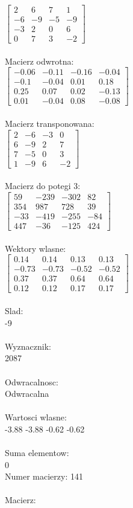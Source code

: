 \documentclass[a4paper,12pt]{article}
\begin{document}
$\begin{bmatrix} 2&6&7&1\\-6&-9&-5&-9\\-3&2&0&6\\0&7&3&-2 \end{bmatrix}$
\\
\\
Macierz odwrotna:\\

$\begin{bmatrix} -0.06&-0.11&-0.16&-0.04\\-0.1&-0.04&0.01&0.18\\0.25&0.07&0.02&-0.13\\0.01&-0.04&0.08&-0.08 \end{bmatrix}$
\\
\\
Macierz transponowana:\\

$\begin{bmatrix} 2&-6&-3&0\\6&-9&2&7\\7&-5&0&3\\1&-9&6&-2 \end{bmatrix}$
\\
\\
Macierz do potegi 3:\\

$\begin{bmatrix} 59&-239&-302&82\\354&987&728&39\\-33&-419&-255&-84\\447&-36&-125&424 \end{bmatrix}$
\\
\\
Wektory wlasne:\\

$\begin{bmatrix} 0.14&0.14&0.13&0.13\\-0.73&-0.73&-0.52&-0.52\\0.37&0.37&0.64&0.64\\0.12&0.12&0.17&0.17 \end{bmatrix}$
\\
\\
Slad:\\
-9
\\
\\
Wyznacznik:\\
2087
\\
\\
Odwracalnosc:\\
Odwracalna
\\
\\
Wartosci wlasne:\\
-3.88 -3.88 -0.62 -0.62
\\
\\
Suma elementow:\\
0
\\
\newpage
Numer macierzy:
141
\\
\\
Macierz:\\
\end{document}
